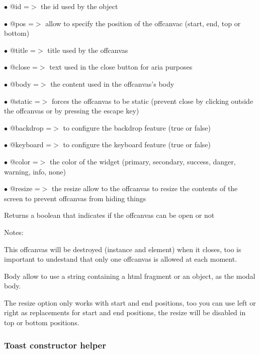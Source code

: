 \documentclass[a4paper]{article}
\begin{document}
\begin{compactitem}
\item[\color{myblue}$\bullet$] @id       =$>$ the id used by the object
\item[\color{myblue}$\bullet$] @pos      =$>$ allow to specify the position of the offcanvac (start, end, top or bottom)
\item[\color{myblue}$\bullet$] @title    =$>$ title used by the offcanvas
\item[\color{myblue}$\bullet$] @close    =$>$ text used in the close button for aria purposes
\item[\color{myblue}$\bullet$] @body     =$>$ the content used in the offcanvas's body
\item[\color{myblue}$\bullet$] @static   =$>$ forces the offcanvas to be static (prevent close by clicking outside the
             offcanvas or by pressing the escape key)
\item[\color{myblue}$\bullet$] @backdrop =$>$ to configure the backdrop feature (true or false)
\item[\color{myblue}$\bullet$] @keyboard =$>$ to configure the keyboard feature (true or false)
\item[\color{myblue}$\bullet$] @color    =$>$ the color of the widget (primary, secondary, success, danger, warning, info, none)
\item[\color{myblue}$\bullet$] @resize   =$>$ the resize allow to the offcanvas to resize the contents of the screen to prevent
             offcanvas from hiding things
\end{compactitem}

Returns a boolean that indicates if the offcanvas can be open or not

Notes:

This offcanvas will be destroyed (instance and element) when it closes, too is important
to undestand that only one offcanvas is allowed at each moment.

Body allow to use a string containing a html fragment or an object, as the modal body.

The resize option only works with start and end positions, too you can use left or right
as replacements for start and end positions, the resize will be disabled in top or bottom
positions.

\hypertarget{toc666}{}
\subsubsection{Toast constructor helper}
\end{document}
